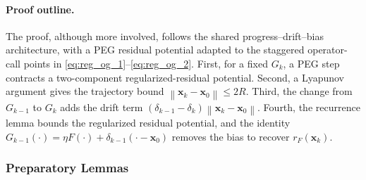 \documentclass[letterpaper,11pt]{article}
\newcommand{\norm}[1]{\left\| #1 \right\|}
\newcommand{\vect}[1]{\mathbf{#1}}
\begin{document}
\paragraph{Proof outline.}
The proof, although more involved, follows the shared progress--drift--bias architecture, with a PEG residual potential adapted to the staggered operator-call points in \eqref{eq:reg_og_1}--\eqref{eq:reg_og_2}. First, for a fixed \(G_k\), a PEG step contracts a two-component regularized-residual potential. Second, a Lyapunov argument gives the trajectory bound \(\norm{\vect{x}_k-\vect{x}_0}\le2R\). Third, the change from \(G_{k-1}\) to \(G_k\) adds the drift term \((\delta_{k-1}-\delta_k)\norm{\vect{x}_k-\vect{x}_0}\). Fourth, the recurrence lemma bounds the regularized residual potential, and the identity \(G_{k-1}(\cdot)=\eta F(\cdot)+\delta_{k-1}(\cdot-\vect{x}_0)\) removes the bias to recover \(r_F(\vect{x}_k)\).

\subsubsection{Preparatory Lemmas}
\end{document}
